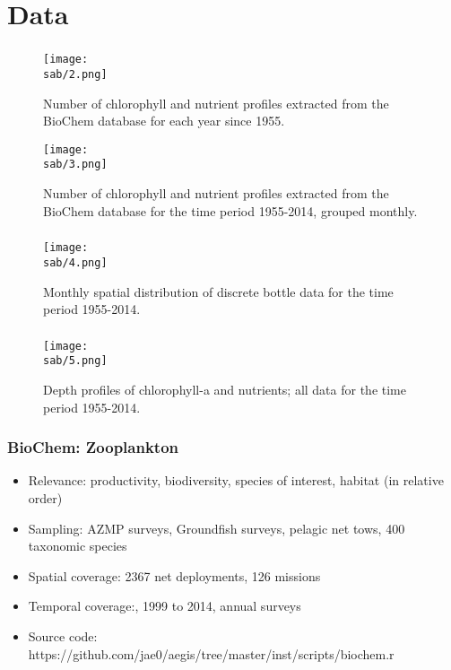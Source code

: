 \documentclass{beamer}
\numberwithin{figure}{section}		%
\numberwithin{table}{section}				%
\newcommand{\D}{.}
\newcommand{\bd}{\string~/bio\D data}   %
\newcommand{\sab}{\bd/mpa/sab}   %
\begin{document}
\section{Data}
\begin{frame}
  \frametitle{}
      \begin{figure}
        \centering
        \texttt{[image: \\sab/2.png]}
        \caption{Number of chlorophyll and nutrient profiles extracted from the BioChem database for each year since 1955.}
        \label{fig:ChloroMap}
      \end{figure}
      \begin{figure}
        \centering
        \texttt{[image: \\sab/3.png]}
        \caption{Number of chlorophyll and nutrient profiles extracted from the BioChem database for the time period 1955-2014, grouped monthly.}
        \label{fig:ChloroFreq}
      \end{figure}
\end{frame}



\begin{frame}[shrink]
  \frametitle{}
  \begin{figure}
    \centering
    \texttt{[image: \\sab/4.png]}
    \caption{Monthly spatial distribution of discrete bottle data for the time period 1955-2014.}
    \label{fig:BottleMap}
  \end{figure}
\end{frame}



\begin{frame}
  \frametitle{}
  \begin{figure}
    \centering
    \texttt{[image: \\sab/5.png]}
    \caption{Depth profiles of chlorophyll-a and nutrients; all data for the time period 1955-2014.}
    \label{fig:ChloroProfiles}
  \end{figure}
\end{frame}




\begin{frame}
  \frametitle{BioChem: Zooplankton}
  \begin{itemize}
    \item Relevance:  productivity, biodiversity, species of interest, habitat (in relative order)
    \item Sampling:  AZMP surveys, Groundfish surveys, pelagic net tows, 400 taxonomic species
    \item Spatial coverage: 2367 net deployments, 126 missions
    \item Temporal coverage:,  1999 to 2014, annual surveys
    \item Source code: https://github.com/jae0/aegis/tree/master/inst/scripts/biochem.r
  \end{itemize}
\end{frame}
\end{document}
